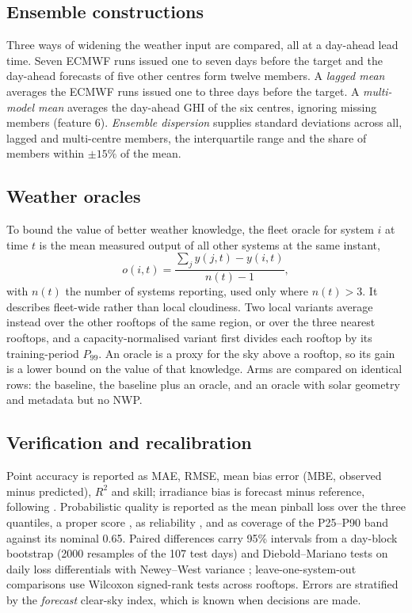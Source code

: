 \subsection{Ensemble constructions}
\label{sec:meth-ens}

Three ways of widening the weather input are compared, all at a day-ahead lead time. Seven ECMWF runs issued one to seven days before the target and the day-ahead forecasts of five other centres form twelve members. A \emph{lagged mean} averages the ECMWF runs issued one to three days before the target. A \emph{multi-model mean} averages the day-ahead GHI of the six centres, ignoring missing members (feature 6). \emph{Ensemble dispersion} supplies standard deviations across all, lagged and multi-centre members, the interquartile range and the share of members within $\pm 15\%$ of the mean.

\subsection{Weather oracles}
\label{sec:meth-oracle}

To bound the value of better weather knowledge, the fleet oracle for system $i$ at time $t$ is the mean measured output of all other systems at the same instant,
\begin{equation}
o(i, t) = \frac{\sum_j y(j, t) - y(i, t)}{n(t) - 1},
\end{equation}
with $n(t)$ the number of systems reporting, used only where $n(t) > 3$. It describes fleet-wide rather than local cloudiness. Two local variants average instead over the other rooftops of the same region, or over the three nearest rooftops, and a capacity-normalised variant first divides each rooftop by its training-period $P_{99}$. An oracle is a proxy for the sky above a rooftop, so its gain is a lower bound on the value of that knowledge. Arms are compared on identical rows: the baseline, the baseline plus an oracle, and an oracle with solar geometry and metadata but no NWP.

\subsection{Verification and recalibration}
\label{sec:meth-verif}

Point accuracy is reported as MAE, RMSE, mean bias error (MBE, observed minus predicted), $R^2$ and skill; irradiance bias is forecast minus reference, following \citet{Tuononen2019}. Probabilistic quality is reported as the mean pinball loss over the three quantiles, a proper score \citep{Gneiting2007}, as reliability \citep{Lauret2019}, and as coverage of the P25--P90 band against its nominal 0.65. Paired differences carry 95\% intervals from a day-block bootstrap (2000 resamples of the 107 test days) and Diebold--Mariano tests on daily loss differentials with Newey--West variance \citep{Diebold1995}; leave-one-system-out comparisons use Wilcoxon signed-rank tests across rooftops. Errors are stratified by the \emph{forecast} clear-sky index, which is known when decisions are made.

